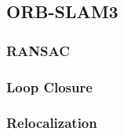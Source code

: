 \subsection{ORB-SLAM3}

\subsubsection{RANSAC}
\subsubsection{Loop Closure}
\subsubsection{Relocalization}